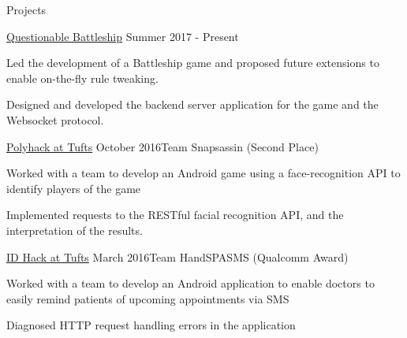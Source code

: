 \documentclass{resume} %
\begin{document}
\begin{rSection}{Projects}




\begin{rSubsection}
    {\href{https://www.questionablebattleship.com/}{Questionable Battleship}}
    {Summer 2017 - Present}{}

\item Led the development of a Battleship game and proposed future extensions to
    enable on-the-fly rule tweaking.

\item Designed and developed the backend server application for the game and the
    Websocket protocol.

\end{rSubsection}

\begin{rSubsection}
    {\href{http://2016.polyhack.tufts.io/}{Polyhack at Tufts}}
    {October 2016}{Team Snapsassin (Second Place)}

\item Worked with a team to develop an Android game using a face-recognition
    API to identify players of the game

\item Implemented requests to the RESTful facial recognition API, and the
    interpretation of the results.

\end{rSubsection}

\begin{rSubsection}
    {\href{https://idhack16.devpost.com/}{ID Hack at Tufts}}
    {March 2016}{Team HandSPASMS (Qualcomm Award)}

\item Worked with a team to develop an Android application to enable doctors
    to easily remind patients of upcoming appointments via SMS

\item Diagnosed HTTP request handling errors in the application

\end{rSubsection}
\end{rSection}
\end{document}
